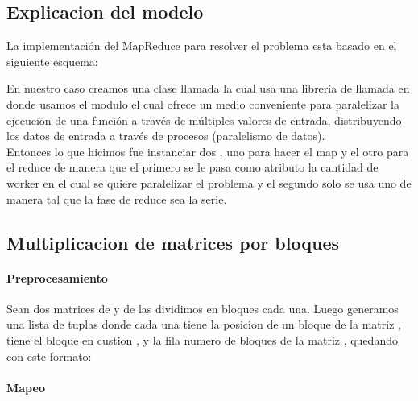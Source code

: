 \subsection{Explicacion del modelo}
    La implementación del MapReduce para resolver el problema esta basado en el
    siguiente esquema:\\

    \def\text{Esquema de un map reduce}
    \def\path{map_reduce_schema.png}
    \def\scale{.6}
    

    En nuestro caso creamos una clase llamada  la cual usa una
    libreria de  llamada  en donde usamos el
    modulo  el cual ofrece un medio conveniente para paralelizar la
    ejecución de una función a través de múltiples valores de entrada, distribuyendo
    los datos de entrada a través de procesos (paralelismo de datos).\\

    Entonces lo que hicimos fue instanciar dos , uno para hacer el map y
    el otro para el reduce de manera que el primero se le pasa como atributo la
    cantidad de worker en el cual se quiere paralelizar el problema y el segundo
    solo se usa uno de manera tal que la fase de reduce sea la serie.

\subsection{Multiplicacion de matrices por bloques}

    \paragraph{Preprocesamiento}

        Sean dos matrices  de  y  de  las
        dividimos en  bloques cada una. Luego generamos una
        lista de tuplas donde cada una tiene la posicion  de un bloque
        de la matriz , tiene el bloque en custion ,
        y la fila numero  de bloques de la matriz , quedando
        con este formato: \\

    \paragraph{Mapeo}


